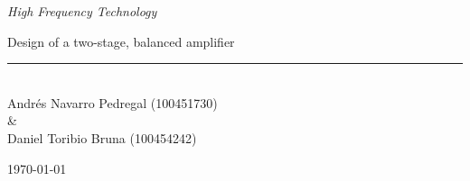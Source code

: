 \documentclass[12pt]{report} %
\begin{document}
	
\begin{titlepage}
	\begin{sffamily}
	\color{azulUC3M}
	\begin{center}
		\begin{figure}[H] %
		\end{figure}
		\vspace{2.5cm}
		\begin{Large}
			\vspace{2cm}		
			\textsl{High Frequency Technology}
			\bigskip
			
		\end{Large}
		 	{\Huge Design of a two-stage, balanced amplifier}\\
		 	\vspace*{0.5cm}
	 		\rule{10.5cm}{0.1mm}\\
			\vspace*{0.9cm}
			{\LARGE Andrés Navarro Pedregal (100451730)}\\ 
            {\LARGE \&}\\
			{\LARGE Daniel Toribio Bruna (100454242)}\\ 
			\vspace*{1cm}
	\vfill
		\begin{Large}
			\today
		\end{Large}
	\end{center}
	\end{sffamily}
\end{titlepage}

\newpage %
\thispagestyle{empty}
\mbox{}


\tableofcontents
\thispagestyle{fancy}

\newpage %
\thispagestyle{empty}


\clearpage
{} %
\end{document}
